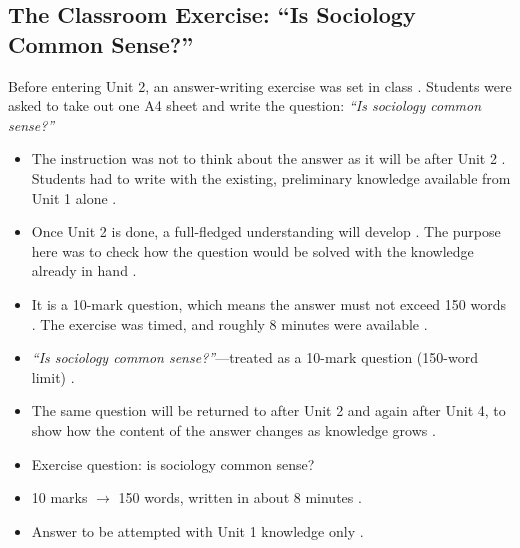 \subsection{The Classroom Exercise: ``Is Sociology Common Sense?''}
Before entering Unit 2, an answer-writing exercise was set in class . Students were asked to take out one A4 sheet and write the question: \textit{``Is sociology common sense?''} 
\begin{itemize}
    \item The instruction was not to think about the answer as it will be after Unit 2 . Students had to write with the existing, preliminary knowledge available from Unit 1 alone .
    \item Once Unit 2 is done, a full-fledged understanding will develop . The purpose here was to check how the question would be solved with the knowledge already in hand .
    \item It is a 10-mark question, which means the answer must not exceed 150 words . The exercise was timed, and roughly 8 minutes were available .
\end{itemize}

\begin{PYQLink}
\begin{itemize}
    \item \textit{``Is sociology common sense?''}---treated as a 10-mark question (150-word limit) .
    \item The same question will be returned to after Unit 2 and again after Unit 4, to show how the content of the answer changes as knowledge grows .
\end{itemize}
\end{PYQLink}

\begin{QuickRevision}
\begin{itemize}
    \item Exercise question: is sociology common sense? 
    \item 10 marks $\rightarrow$ 150 words, written in about 8 minutes .
    \item Answer to be attempted with Unit 1 knowledge only .
\end{itemize}
\end{QuickRevision}


